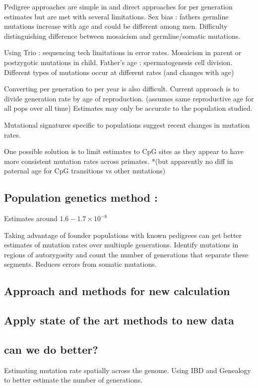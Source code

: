 \documentclass[
11pt, %
oneside, %
english, %
doublespacing, %
headsepline, %
]{MastersDoctoralThesis} %
\begin{document}
Pedigree approaches are simple in and direct approaches for per generation estimates but are met with several limitations.
Sex bias : fathers germline mutations increase with age and could be different among men.
Difficulty distinguishing difference between mosaicism and germline/somatic mutations.

Using Trio : sequencing tech limitations in error rates.
Mosaicism in parent or postzygotic mutations in child.
Father's age : spermatogenesis cell division.
Different types of mutations occur at different rates (and changes with age)

Converting per generation to per year is also difficult. 
Current approach is to divide generation rate by age of reproduction. (assumes same reproductive age for all pops over all time)
Estimates may only be accurate to the population studied. 

Mutational signatures specific to populations suggest recent changes in mutation rates. 

One possible solution is to limit estimates to CpG sites as they appear to have more consistent mutation rates across primates. *(but apparently no diff in paternal age for CpG transitions vs other mutations)

\subsection{Population genetics method : }
Estimates around $1.6-1.7\times10^{-8}$

Taking advantage of founder populations with known pedigrees can get better estimates of mutation rates over multiuple generations.
Identify mutations in regions of autozygosity and count the number of generations that separate these segments. 
Reduces errors from somatic mutations. 
\subsection{Approach and methods for new calculation}

\subsection{Apply state of the art methods to new data}

\subsection{can we do better?}
Estimating mutation rate spatially across the genome.
Using IBD and Genealogy to better estimate the number of generations.
\end{document}
